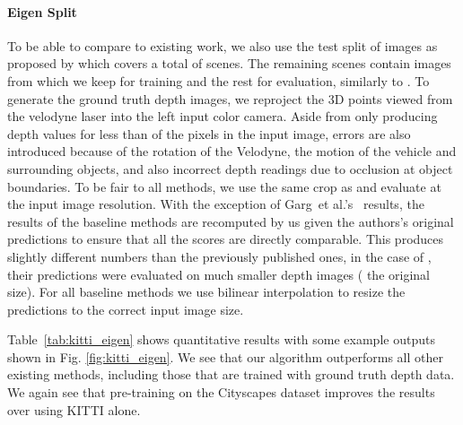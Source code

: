 \documentclass[10pt,twocolumn,letterpaper]{article}
\makeatletter
\newcommand*{\ea}{et al.\@\xspace}
\makeatother
\begin{document}
\paragraph{Eigen Split}
To be able to compare to existing work, we also use the test split of  images as proposed by \cite{eigen2014depth} which covers a total of  scenes. The remaining  scenes contain  images from which we keep  for training and the rest for evaluation, similarly to \cite{garg2016unsupervised}.
To generate the ground truth depth images, we reproject the 3D points viewed from the velodyne laser into the left input color camera. 
Aside from only producing depth values for less than  of the pixels in the input image, errors are also introduced because of the rotation of the Velodyne, the motion of the vehicle and surrounding objects, and also incorrect depth readings due to occlusion at object boundaries. 
To be fair to all methods, we use the same crop as \cite{eigen2014depth} and evaluate at the input image resolution. 
With the exception of Garg~\ea's~\cite{garg2016unsupervised} results, the results of the baseline methods are recomputed by us given the authors's original predictions to ensure that all the scores are directly comparable. 
This produces slightly different numbers than the previously published ones, \eg in the case of \cite{eigen2014depth}, their predictions were evaluated on much smaller depth images ( the original size).
For all baseline methods we use bilinear interpolation to resize the predictions to the correct input image size. 

Table~\ref{tab:kitti_eigen} shows quantitative results with some example outputs shown in Fig. \ref{fig:kitti_eigen}.
We see that our algorithm outperforms all other existing methods, including those that are trained with ground truth depth data. 
We again see that pre-training on the Cityscapes dataset improves the results over using KITTI alone.
\end{document}

